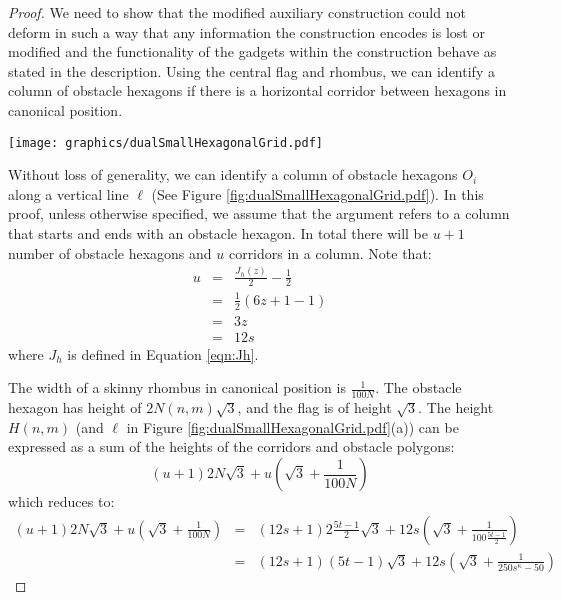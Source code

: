 \documentclass[10pt]{CSUNthesis}
\theoremstyle{plain}%
\theoremstyle{definition}
\theoremstyle{remark}
\newcommand{\lr}[1]{\left( #1 \right)}
\begin{document}
\begin{proof}
We need to show that the modified auxiliary construction could not deform in such a way that any information the construction encodes is lost or modified and the functionality of the gadgets within the construction behave as stated in the description.  
Using the central flag and rhombus, we can identify a column of obstacle hexagons if there is a horizontal corridor between hexagons in canonical position.

\begin{minipage}{\linewidth}
\begin{center}
\texttt{[image: graphics/dualSmallHexagonalGrid.pdf]}
\label{fig:dualSmallHexagonalGrid.pdf}
\end{center}
\end{minipage}

Without loss of generality, we can identify a column of obstacle hexagons $O_i$ along a vertical line $\ell$ (See Figure \ref{fig:dualSmallHexagonalGrid.pdf}).
In this proof, unless otherwise specified, we assume that the argument refers to a column that starts and ends with an obstacle hexagon.  
In total there will be $u+1$ number of obstacle hexagons and $u$ corridors in a column.
Note that:
$$\begin{array}{rcl}
u&=& \frac{J_h (z)}{2} - \frac{1}{2}\\
&=& \frac{1}{2}\lr{6z + 1 - 1}\\
&=& 3z\\
&=& 12s
\end{array}$$
where $J_h$ is defined in Equation \ref{eqn:Jh}.

The width of a skinny rhombus in canonical position is $\frac{1}{100N}$.
The obstacle hexagon has height of $ 2 N(n,m) \sqrt{3}$, and the flag is of height $\sqrt{3}$. 
The height $H(n,m)$ (and $\ell$ in Figure \ref{fig:dualSmallHexagonalGrid.pdf}(a)) can be expressed as a sum of the heights of the corridors and obstacle polygons:
$$(u+1) 2 N \sqrt{3} + u \lr{\sqrt{3}+ \frac{1}{100N}}$$
which reduces to:
\begin{eqnarray*}
(u+1) 2 N  \sqrt{3} + u \lr{\sqrt{3}+ \frac{1}{100N}}&=&(12s+1) 2 \frac{5t-1}{2}  \sqrt{3} + 12s \lr{\sqrt{3}+ \frac{1}{100\frac{5t-1}{2}}}\\
&=&(12s+1)  (5t-1)  \sqrt{3} + 12s \lr{\sqrt{3}+ \frac{1}{250s^\kappa-50}}
\end{eqnarray*}


\end{proof}
\end{document}
